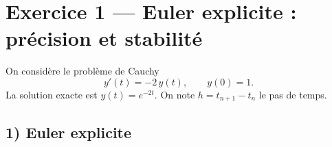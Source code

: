 \vspace{1em}

\section*{Exercice 1 --- Euler explicite : précision et stabilité}

On considère le problème de Cauchy
\[
  y'(t) = -2\,y(t), \qquad y(0) = 1.
\]
La solution exacte est $y(t) = e^{-2t}$. On note $h = t_{n+1} - t_n$ le pas de temps.

\subsection*{1) Euler explicite}
